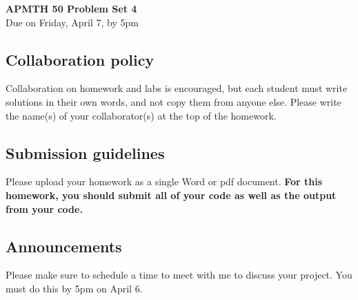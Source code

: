 \documentclass[12pt]{article}
\begin{document}
\begin{center}{\Large \bf{APMTH 50 Problem Set 4}} \vspace{0.2in}\\
{\large Due on Friday, April 7, by 5pm\\}
\end{center}

\subsection*{Collaboration policy}
Collaboration on homework and labs is
encouraged, but each student must write solutions in their own words, and not
copy them from anyone else.  Please write the name(s) of your collaborator(s) at the top of the homework.

\subsection*{Submission guidelines} Please upload your homework as a single Word or pdf document.   \textbf{For this homework, you should submit all of your code as well as the output from your code.}%
\subsection*{Announcements} 
Please make sure to schedule a time to meet with me to discuss your project.   You must do this by 5pm on April 6.
\end{document}
